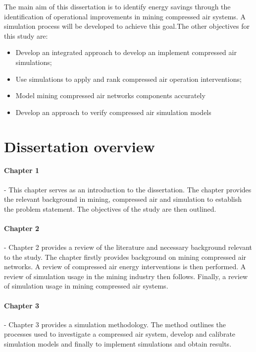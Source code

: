 		The main aim of this dissertation is to identify energy savings through the identification of operational improvements in mining compressed air systems. A simulation process will be developed to achieve this goal.The other objectives for this study are:
		\begin{itemize}
			\item Develop an integrated approach to develop an implement compressed air simulations;
			\item Use simulations to apply and rank compressed air operation interventions;
			\item Model mining compressed air networks components accurately
			\item Develop an approach to verify compressed air simulation models
		\end{itemize}
		
\section{Dissertation overview}
	\paragraph{Chapter 1} \hspace{0.4cm} - \hspace{0.05cm} This chapter serves as an introduction to the dissertation. The chapter provides the relevant background in mining, compressed air and simulation to establish the problem statement. The objectives of the study are then outlined.
	\paragraph{Chapter 2} \hspace{0.4cm} - \hspace{0.05cm} Chapter 2 provides a review of the literature and necessary background relevant to the study. The chapter firstly provides background on mining compressed air networks. A review of compressed air energy interventions is then performed. A review of simulation usage in the mining industry then follows. Finally, a review of simulation usage in mining compressed air systems.
	\paragraph{Chapter 3} \hspace{0.4cm} - \hspace{0.05cm} Chapter 3 provides a simulation methodology. The method outlines the processes used to investigate a compressed air system, develop and calibrate simulation models and finally to implement simulations and obtain results.
